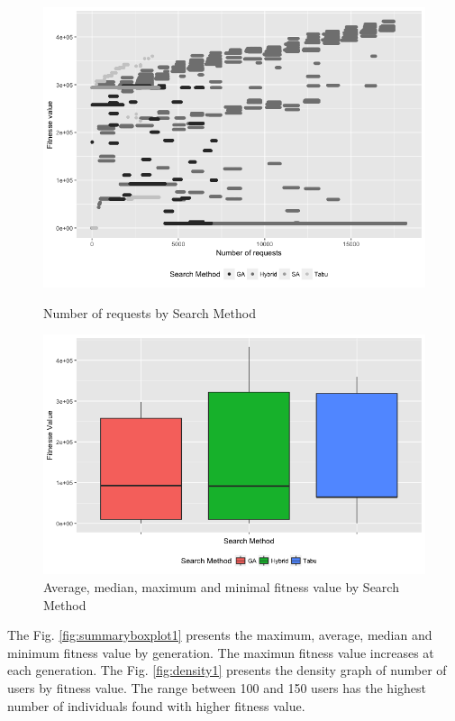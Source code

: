 \begin{figure}[h]
\begin{minipage}{.5\textwidth}
\centering
\includegraphics[width=1\textwidth]{./images/experiment1-3-bw.png}
\caption{Number of requests by Search Method}
\label{fig:numberofrequestsbysearchmethod}
\end{minipage}
\begin{minipage}{.5\textwidth}
\centering
\includegraphics[width=1\textwidth]{./images/experiment1-4.png}
\caption{Average, median, maximum and minimal fitness value by Search Method}
\label{fig:boxplot1}
\end{minipage}
\end{figure}

The Fig. \ref{fig:summaryboxplot1} presents the maximum, average, median and minimum fitness value by generation. The maximun fitness value increases at each generation. The Fig. \ref{fig:density1} presents the density graph of number of users by fitness value. The range between 100 and 150 users has the highest number of individuals found with higher fitness value.

